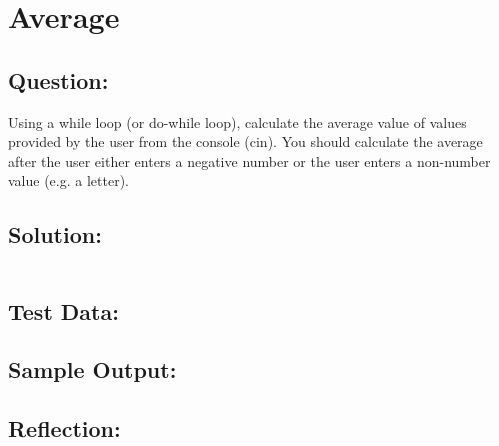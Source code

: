 \documentclass[main.tex]{subfiles}
\begin{document}
    \section{Average}
        \subsection*{Question:}
        Using a while loop (or do-while loop), calculate the average value of values provided by the user from the console (cin).
        You should calculate the average after the user either enters a negative number or the user enters a non-number value (e.g. a letter).
            
        \subsection*{Solution:}
            \inputminted{cpp}{../06-Average/Average.cpp}%

        \subsection*{Test Data:}
        
        \subsection*{Sample Output:}

        \subsection*{Reflection:}
\end{document}
